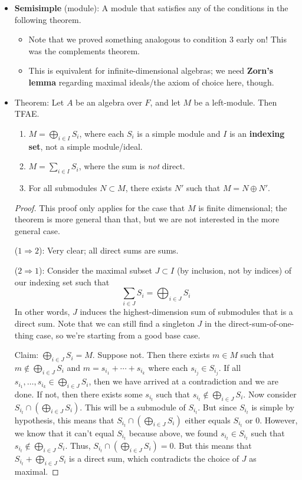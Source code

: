 \documentclass[../notes.tex]{subfiles}
\begin{document}
\begin{itemize}
    \item \textbf{Semisimple} (module): A module that satisfies any of the conditions in the following theorem.
    \begin{itemize}
        \item Note that we proved something analogous to condition 3 early on! This was the complements theorem.
        \item This is equivalent for infinite-dimensional algebras; we need \textbf{Zorn's lemma} regarding maximal ideals/the axiom of choice here, though.
    \end{itemize}
    \item Theorem: Let $A$ be an algebra over $F$, and let $M$ be a left-module. Then TFAE.
    \begin{enumerate}
        \item $M=\bigoplus_{i\in I}S_i$, where each $S_i$ is a simple module and $I$ is an \textbf{indexing set}, not a simple module/ideal.
        \item $M=\sum_{i\in I}S_i$, where the sum is \emph{not} direct.
        \item For all submodules $N\subset M$, there exists $N'$ such that $M=N\oplus N'$.
    \end{enumerate}
    \begin{proof}
        This proof only applies for the case that $M$ is finite dimensional; the theorem is more general than that, but we are not interested in the more general case.\par\smallskip
        ($1\Rightarrow 2$): Very clear; all direct sums are sums.\par\smallskip
        ($2\Rightarrow 1$): Consider the maximal subset $J\subset I$ (by inclusion, not by indices) of our indexing set such that
        \begin{equation*}
            \sum_{i\in J}S_i = \bigoplus_{i\in J}S_i
        \end{equation*}
        In other words, $J$ induces the highest-dimension sum of submodules that is a direct sum. Note that we can still find a singleton $J$ in the direct-sum-of-one-thing case, so we're starting from a good base case.\par
        Claim: $\bigoplus_{i\in J}S_i=M$. Suppose not. Then there exists $m\in M$ such that $m\notin\bigoplus_{i\in J}S_i$ and $m=s_{i_1}+\cdots+s_{i_k}$ where each $s_{i_j}\in S_{i_j}$. If all $s_{i_1},\dots,s_{i_k}\in\bigoplus_{i\in J}S_i$, then we have arrived at a contradiction and we are done. If not, then there exists some $s_{i_t}$ such that $s_{i_t}\notin\bigoplus_{i\in J}S_i$. Now consider $S_{i_t}\cap(\bigoplus_{i\in J}S_{i})$. This will be a submodule of $S_{i_t}$. But since $S_{i_t}$ is simple by hypothesis, this means that $S_{i_t}\cap(\bigoplus_{i\in J}S_{i})$ either equals $S_{i_t}$ or $0$. However, we know that it can't equal $S_{i_t}$ because above, we found $s_{i_t}\in S_{i_t}$ such that $s_{i_t}\notin\bigoplus_{i\in J}S_i$. Thus, $S_{i_t}\cap(\bigoplus_{i\in J}S_{i})=0$. But this means that $S_{i_t}+\bigoplus_{i\in J}S_i$ is a direct sum, which contradicts the choice of $J$ as maximal.\par\smallskip

\end{proof}
\end{itemize}
\end{document}
